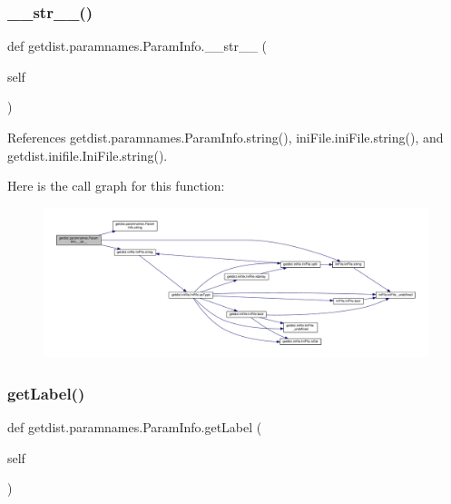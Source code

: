 \subsubsection{\texorpdfstring{\+\_\+\+\_\+str\+\_\+\+\_\+()}{\_\_str\_\_()}}
{\footnotesize\ttfamily def getdist.\+paramnames.\+Param\+Info.\+\_\+\+\_\+str\+\_\+\+\_\+ (\begin{DoxyParamCaption}\item[{}]{self }\end{DoxyParamCaption})}



References getdist.\+paramnames.\+Param\+Info.\+string(), ini\+File.\+ini\+File.\+string(), and getdist.\+inifile.\+Ini\+File.\+string().

Here is the call graph for this function\+:
\nopagebreak
\begin{figure}[H]
\begin{center}
\leavevmode
\includegraphics[width=350pt]{classgetdist_1_1paramnames_1_1ParamInfo_a15bd2f5866334a64ac62a19db186ee7a_cgraph}
\end{center}
\end{figure}
\mbox{\label{classgetdist_1_1paramnames_1_1ParamInfo_a0d07efab6ae9148d54bba8515d7ff34d}} 
\subsubsection{\texorpdfstring{get\+Label()}{getLabel()}}
{\footnotesize\ttfamily def getdist.\+paramnames.\+Param\+Info.\+get\+Label (\begin{DoxyParamCaption}\item[{}]{self }\end{DoxyParamCaption})}



